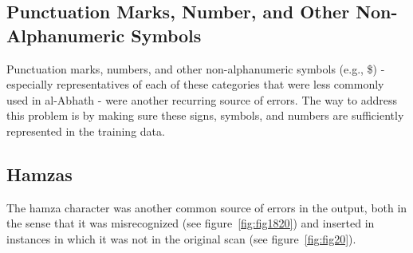 \subsection{Punctuation Marks, Number, and Other Non-Alphanumeric Symbols}

Punctuation marks, numbers, and other non-alphanumeric symbols (e.g.,
\$) - especially representatives of each of these categories that were less
commonly used in al-Abhath - were another recurring source of errors. The way to
address this problem is by making sure these signs, symbols, and numbers are
sufficiently represented in the training data.

\subsection{Hamzas}

The hamza character was another common source of errors in the output, both in
the sense that it was misrecognized (see
figure~\ref{fig:fig1820}) and inserted in instances in which
it was not in the original scan (see figure~\ref{fig:fig20}). 

